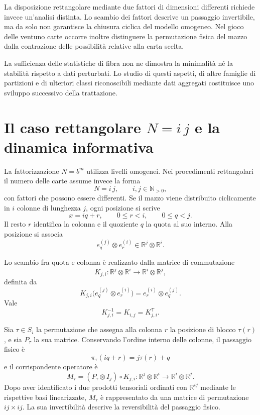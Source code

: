 	La disposizione rettangolare mediante due fattori di dimensioni
	differenti richiede invece un'analisi distinta. Lo scambio dei fattori
	descrive un passaggio invertibile, ma da solo non garantisce la chiusura
	ciclica del modello omogeneo. Nel gioco delle ventuno carte occorre
	inoltre distinguere la permutazione fisica del mazzo dalla contrazione
	delle possibilità relative alla carta scelta.

	La sufficienza delle statistiche di fibra non ne dimostra la minimalità
	né la stabilità rispetto a dati perturbati. Lo studio di questi aspetti,
	di altre famiglie di partizioni e di ulteriori classi riconoscibili
	mediante dati aggregati costituisce uno sviluppo successivo della
	trattazione.

\appendix

	\section{Il caso rettangolare
		\texorpdfstring{\(N=i\,j\)}{N=ij} e la dinamica informativa}

	La fattorizzazione \(N=b^m\) utilizza livelli omogenei. Nei procedimenti
	rettangolari il numero delle carte assume invece la forma
	\[
	N=i\,j,
	\qquad i,j\in\mathbb N_{>0},
	\]
	con fattori che possono essere differenti. Se il mazzo viene distribuito
	ciclicamente in \(i\) colonne di lunghezza \(j\), ogni posizione si scrive
	\[
	x=iq+r,
	\qquad
	0\le r<i,
	\qquad
	0\le q<j.
	\]
	Il resto \(r\) identifica la colonna e il quoziente \(q\) la quota al suo
	interno. Alla posizione si associa
	\[
	e_q^{(j)}\otimes e_r^{(i)}
	\in
	\mathbb R^j\otimes\mathbb R^i.
	\]

	Lo scambio fra quota e colonna è realizzato dalla matrice di commutazione
	\[
	K_{j,i}:
	\mathbb R^j\otimes\mathbb R^i
	\longrightarrow
	\mathbb R^i\otimes\mathbb R^j,
	\]
	definita da
	\[
	K_{j,i}
	\bigl(e_q^{(j)}\otimes e_r^{(i)}\bigr)
	=
	e_r^{(i)}\otimes e_q^{(j)}.
	\]
	Vale
	\[
	K_{j,i}^{-1}=K_{i,j}=K_{j,i}^{\mathsf T}.
	\]

	Sia \(\tau\in S_i\) la permutazione che assegna alla colonna \(r\) la
	posizione di blocco \(\tau(r)\), e sia \(P_\tau\) la sua matrice. Conservando
	l'ordine interno delle colonne, il passaggio fisico è
	\[
	\pi_\tau(iq+r)
	=
	j\tau(r)+q
	\]
	e il corrispondente operatore è
	\[
	M_\tau
	=
	(P_\tau\otimes I_j)\circ K_{j,i}:
	\mathbb R^j\otimes\mathbb R^i
	\longrightarrow
	\mathbb R^i\otimes\mathbb R^j.
	\]
	Dopo aver identificato i due prodotti tensoriali ordinati con
	\(\mathbb R^{ij}\) mediante le rispettive basi linearizzate, \(M_\tau\) è
	rappresentato da una matrice di permutazione \(ij\times ij\). La sua
	invertibilità descrive la reversibilità del passaggio fisico.


